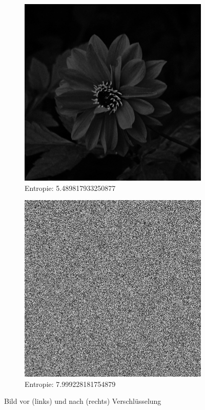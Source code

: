 \begin{figure}
	\centering

	\begin{subfigure}{0.35\textwidth}
		\includegraphics[width=\textwidth]{../1/3/gray_5.489817933250877_flower.jpg}
		\caption{Entropie: 5.489817933250877}
	\end{subfigure}
	\hfill
	\begin{subfigure}{0.35\textwidth}
		\includegraphics[width=\textwidth]{../1/3/encrypted_7.999228181754879_flower.jpg}
		\caption{Entropie: 7.999228181754879}
	\end{subfigure}

	\caption{Bild vor (links) und nach (rechts) Verschlüsselung}
	\label{fig:flower}
\end{figure}

